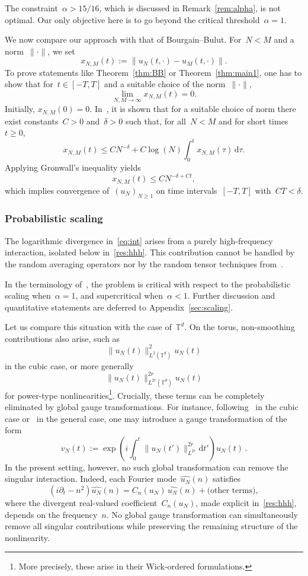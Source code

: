 \documentclass[11pt,reqno,english]{amsart}
\numberwithin{equation}{section}
\theoremstyle{plain}
\theoremstyle{definition}
\theoremstyle{remark}
\begin{document}
The constraint~$\alpha>15/16$, which is discussed in Remark~\ref{rem:alpha}, is not optimal. Our only objective here is to go beyond the critical threshold~$\alpha=1$.


We now compare our approach with that of Bourgain--Bulut.
For~$N<M$ and a norm~$\|\cdot\|$, we set
\[
x_{N,M}(t):=\|u_{N}(t,\cdot)-u_{M}(t,\cdot)\|.
\]
To prove statements like Theorem~\ref{thm:BB} or Theorem~\ref{thm:main1}, one has to show that for~$t\in [-T,T]$ and a suitable choice of the norm~$\|\cdot\|$,
\[
\lim_{N,M\to\infty}
x_{N,M}(t)=0.
\]
Initially, $x_{N,M}(0)=0$. In~\cite{BB14}, it is shown that for a suitable choice of norm there exist constants~$C>0$ and~$\delta>0$ such that, for all~$N<M$ and for short times~$t\geq0$,
\begin{equation}
	\label{eq:int}
	x_{N,M}(t)\leq CN^{-\delta}+C\log(N)\int_{0}^{t}x_{N,M}(\tau)\,\mathrm{d}\tau.
\end{equation}
Applying Gronwall's inequality yields
\[
x_{N,M}(t)\leq CN^{-\delta+Ct},
\]
which implies convergence of~$(u_{N})_{N\geq1}$ on time intervals~$[-T,T]$ with~$CT<\delta$.


\subsubsection{Probabilistic scaling}
The logarithmic divergence in~\eqref{eq:int} arises from a purely high-frequency interaction, isolated below in~\eqref{res:hhh}.
This contribution cannot be handled by the random averaging operators nor by the random tensor techniques from~\cite{DNY24,DNY22}.

In the terminology of~\cite[Paragraph~2.2]{DNYvietnam}, the problem is critical with respect to the probabilistic scaling when~$\alpha=1$, and supercritical when~$\alpha<1$.
Further discussion and quantitative statements are deferred to Appendix~\ref{sec:scaling}.

Let us compare this situation with the case of~$\mathbb{T}^{d}$.
On the torus, non-smoothing contributions also arise, such as
\[
\|u_{N}(t)\|_{L^{2}(\mathbb{T}^{d})}^{2}u_{N}(t)
\]
in the cubic case, or more generally
\[
\|u_{N}(t)\|_{L^{2r}(\mathbb{T}^{d})}^{2r}u_{N}(t)
\]
for power-type nonlinearities\footnote{More precisely, these arise in their Wick-ordered formulations.}.
Crucially, these terms can be completely eliminated by global gauge transformations.
For instance, following~\cite{Bou96} in the cubic case or~\cite{NS15,DNY24} in the general case, one may introduce a gauge transformation of the form
\[
v_{N}(t):=\exp\left(i\int_{0}^{t}\|u_{N}(t')\|_{L^{2r}}^{2r}\mathrm{d}t'\right)u_{N}(t)\,.
\]
In the present setting, however, no such global transformation can remove the singular interaction.
Indeed, each Fourier mode~$\widehat{u_{N}}(n)$ satisfies
\begin{equation}
	\label{eq:Cn}
	(i\partial_{t}-n^{2})\widehat{u_{N}}(n)
	= C_{n}(u_{N})\,\widehat{u_{N}}(n)+\text{(other terms)},
\end{equation}
where the divergent real-valued coefficient~$C_{n}(u_{N})$, made explicit in~\eqref{res:hhh}, depends on the frequency~$n$.
No global gauge transformation can simultaneously remove all singular contributions while preserving the remaining structure of the nonlinearity.
\end{document}
